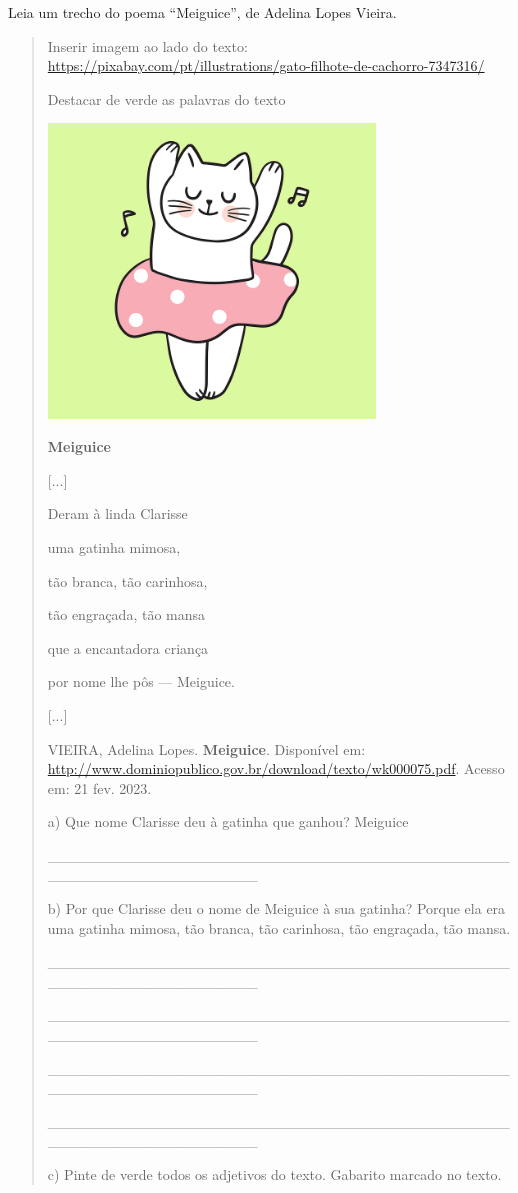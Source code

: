 Leia um trecho do poema ``Meiguice'', de Adelina Lopes Vieira.

\begin{quote}
Inserir imagem ao lado do texto:
\url{https://pixabay.com/pt/illustrations/gato-filhote-de-cachorro-7347316/}

Destacar de verde as palavras do texto

\includegraphics[width=3.41667in,height=3.07500in]{media/image23.png}

\textbf{Meiguice}

{[}...{]}

Deram à linda Clarisse

uma gatinha mimosa,

tão branca, tão carinhosa,

tão engraçada, tão mansa

que a encantadora criança

por nome lhe pôs --- Meiguice.

{[}...{]}

VIEIRA, Adelina Lopes. \textbf{Meiguice}. Disponível em:
\url{http://www.dominiopublico.gov.br/download/texto/wk000075.pdf}.
Acesso em: 21 fev. 2023.

a) Que nome Clarisse deu à gatinha que ganhou? Meiguice

\_\_\_\_\_\_\_\_\_\_\_\_\_\_\_\_\_\_\_\_\_\_\_\_\_\_\_\_\_\_\_\_\_\_\_\_\_\_\_\_\_\_\_\_\_\_\_\_\_\_\_\_\_\_\_\_\_\_\_\_\_\_\_\_

b) Por que Clarisse deu o nome de Meiguice à sua gatinha? Porque ela era
uma gatinha mimosa, tão branca, tão carinhosa, tão engraçada, tão mansa.

\_\_\_\_\_\_\_\_\_\_\_\_\_\_\_\_\_\_\_\_\_\_\_\_\_\_\_\_\_\_\_\_\_\_\_\_\_\_\_\_\_\_\_\_\_\_\_\_\_\_\_\_\_\_\_\_\_\_\_\_\_\_\_\_

\_\_\_\_\_\_\_\_\_\_\_\_\_\_\_\_\_\_\_\_\_\_\_\_\_\_\_\_\_\_\_\_\_\_\_\_\_\_\_\_\_\_\_\_\_\_\_\_\_\_\_\_\_\_\_\_\_\_\_\_\_\_\_\_

\_\_\_\_\_\_\_\_\_\_\_\_\_\_\_\_\_\_\_\_\_\_\_\_\_\_\_\_\_\_\_\_\_\_\_\_\_\_\_\_\_\_\_\_\_\_\_\_\_\_\_\_\_\_\_\_\_\_\_\_\_\_\_\_

\_\_\_\_\_\_\_\_\_\_\_\_\_\_\_\_\_\_\_\_\_\_\_\_\_\_\_\_\_\_\_\_\_\_\_\_\_\_\_\_\_\_\_\_\_\_\_\_\_\_\_\_\_\_\_\_\_\_\_\_\_\_\_\_

c) Pinte de verde todos os adjetivos do texto. Gabarito marcado no
texto.
\end{quote}


